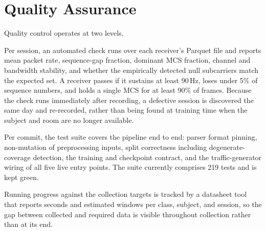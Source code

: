 \section{Quality Assurance}

Quality control operates at two levels.

Per session, an automated check runs over each receiver's Parquet file and
reports mean packet rate, sequence-gap fraction, dominant MCS fraction,
channel and bandwidth stability, and whether the empirically detected null
subcarriers match the expected set. A receiver passes if it sustains at least
90\,Hz, loses under 5\% of sequence numbers, and holds a single MCS for at
least 90\% of frames. Because the check runs immediately after recording, a
defective session is discovered the same day and re-recorded, rather than
being found at training time when the subject and room are no longer
available.

Per commit, the test suite covers the pipeline end to end: parser format
pinning, non-mutation of preprocessing inputs, split correctness including
degenerate-coverage detection, the training and checkpoint contract, and the
traffic-generator wiring of all five live entry points. The suite currently
comprises 219 tests and is kept green.

Running progress against the collection targets is tracked by a datasheet
tool that reports seconds and estimated windows per class, subject, and
session, so the gap between collected and required data is visible
throughout collection rather than at its end.
